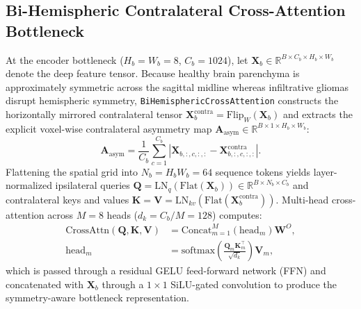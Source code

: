 \documentclass[conference]{IEEEtran}
\begin{document}
\subsection{Bi-Hemispheric Contralateral Cross-Attention Bottleneck}
At the encoder bottleneck ($H_b = W_b = 8$, $C_b = 1024$), let $\mathbf{X}_b \in \mathbb{R}^{B \times C_b \times H_b \times W_b}$ denote the deep feature tensor. Because healthy brain parenchyma is approximately symmetric across the sagittal midline whereas infiltrative gliomas disrupt hemispheric symmetry, \texttt{BiHemisphericCrossAttention} constructs the horizontally mirrored contralateral tensor $\mathbf{X}_b^{\text{contra}} = \text{Flip}_W(\mathbf{X}_b)$ and extracts the explicit voxel-wise contralateral asymmetry map $\mathbf{A}_{\text{asym}} \in \mathbb{R}^{B \times 1 \times H_b \times W_b}$:
\begin{equation}
    \mathbf{A}_{\text{asym}} = \frac{1}{C_b}\sum_{c=1}^{C_b} \left|\mathbf{X}_{b,:,c,:,:} - \mathbf{X}_{b,:,c,:,:}^{\text{contra}}\right|.
    \label{eq:asym_map}
\end{equation}
Flattening the spatial grid into $N_b = H_b W_b = 64$ sequence tokens yields layer-normalized ipsilateral queries $\mathbf{Q} = \text{LN}_q(\text{Flat}(\mathbf{X}_b)) \in \mathbb{R}^{B \times N_b \times C_b}$ and contralateral keys and values $\mathbf{K} = \mathbf{V} = \text{LN}_{kv}(\text{Flat}(\mathbf{X}_b^{\text{contra}}))$. Multi-head cross-attention across $M = 8$ heads ($d_k = C_b / M = 128$) computes:
\begin{equation}
\begin{aligned}
    \text{CrossAttn}(\mathbf{Q},\mathbf{K},\mathbf{V}) &= \text{Concat}_{m=1}^{M}\!\left(\text{head}_m\right)\mathbf{W}^O, \\
    \text{head}_m &= \text{softmax}\!\left(\frac{\mathbf{Q}_m \mathbf{K}_m^\top}{\sqrt{d_k}}\right)\mathbf{V}_m,
\end{aligned}
    \label{eq:cross_attn}
\end{equation}
which is passed through a residual GELU feed-forward network (FFN) and concatenated with $\mathbf{X}_b$ through a $1\times 1$ SiLU-gated convolution to produce the symmetry-aware bottleneck representation.
\end{document}
